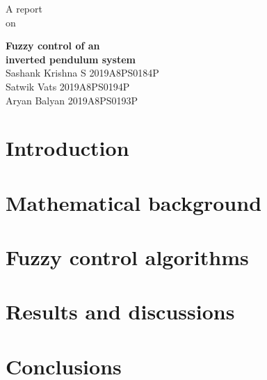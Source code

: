 \documentclass[a4paper, 12pt]{article}
\begin{document}
\newcommand{\code}[1]{\colorbox{light-gray}{\texttt{#1}}}


\lstset{language=Matlab}


\begin{titlepage}
    \centering
    \vfill
    \begin{Large}
        A report \\ on \vspace{0.8cm} \\
    \end{Large}
    \textbf{\Huge  Fuzzy control of an \\ \vspace{0.6cm} inverted pendulum system} \\
    \vspace{10cm}
    \Large{ \hfill Sashank Krishna S \hfill 2019A8PS0184P \hspace{2cm}} \hfill \\ \vspace{0.5cm}
    \Large{ \hfill Satwik Vats  \hfill 2019A8PS0194P \hspace{2cm}} \hfill \\ \vspace{0.5cm}
    \Large{ \hfill Aryan Balyan \hfill 2019A8PS0193P \hspace{2cm}} \hfill \\ \vspace{0.5cm}

\end{titlepage}

\eject

\tableofcontents

\eject



\section{Introduction}

\section{Mathematical background}

\cite{ref1}

\section{Fuzzy control algorithms}

\section{Results and discussions}

\section{Conclusions}

\pagebreak

\printbibliography[heading=bibnumbered]


\pagebreak
\end{document}
